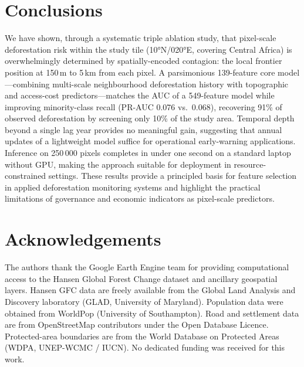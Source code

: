 \documentclass{iopart}
\begin{document}
\section{Conclusions}

We have shown, through a systematic triple ablation study, that
pixel-scale deforestation risk within the study tile (10°N/020°E,
covering Central Africa) is overwhelmingly
determined by spatially-encoded contagion: the local frontier
position at 150\,m to 5\,km from each pixel.
A parsimonious 139-feature core model---combining multi-scale
neighbourhood deforestation history with topographic and
access-cost predictors---matches the AUC of a 549-feature model
while improving minority-class recall (PR-AUC 0.076 vs.\ 0.068),
recovering 91\% of observed deforestation by screening only 10\%
of the study area.
Temporal depth beyond a single lag year provides no meaningful gain,
suggesting that annual updates of a lightweight model suffice for
operational early-warning applications.
Inference on 250\,000 pixels completes in under one second on a
standard laptop without GPU, making the approach suitable for
deployment in resource-constrained settings.
These results provide a principled basis for feature selection
in applied deforestation monitoring systems and highlight the
practical limitations of governance and economic indicators
as pixel-scale predictors.


\section*{Acknowledgements}
The authors thank the Google Earth Engine team for providing
computational access to the Hansen Global Forest Change dataset
and ancillary geospatial layers.
Hansen GFC data are freely available from the Global Land Analysis
and Discovery laboratory (GLAD, University of Maryland).
Population data were obtained from WorldPop (University of Southampton).
Road and settlement data are from OpenStreetMap contributors
under the Open Database Licence.
Protected-area boundaries are from the World Database on Protected Areas
(WDPA, UNEP-WCMC / IUCN).
No dedicated funding was received for this work.




\end{document}
